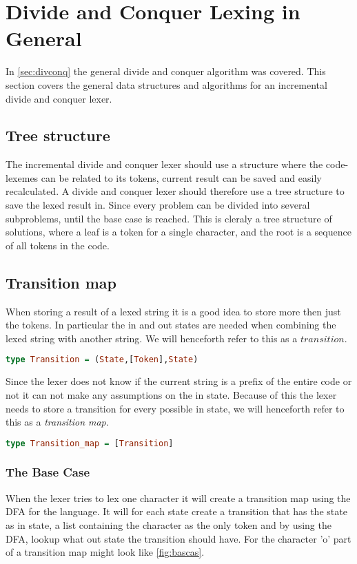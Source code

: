 \section{Divide and Conquer Lexing in General}
In \cref{sec:divconq} the general divide and conquer algorithm was covered. This
section covers the general data structures and algorithms for an incremental
divide and conquer lexer.

\subsection{Tree structure}
The incremental divide and conquer lexer should use a structure where the
code-lexemes can be related to its tokens, current result can be saved and
easily recalculated. A divide and conquer lexer should therefore use a tree
structure to save the lexed result in. Since every problem can be divided into
several subproblems, until the base case is reached. This is cleraly a tree
structure of solutions, where a leaf is a token for a single character, and the
root is a sequence of all tokens in the code.  

\subsection{Transition map}
When storing a result of a lexed string it is a good idea to store more then
just the tokens. In particular the in and out states are needed when combining
the lexed string with another string. We will henceforth refer to this as a
$transition$.
\begin{lstlisting}[language=Haskell]
type Transition = (State,[Token],State)
\end{lstlisting}
Since the lexer does not know if the current string is a prefix of the entire
code or not it can not make any assumptions on the in state. Because of this the
lexer needs to store a transition for every possible in state, we will henceforth
refer to this as a \emph{transition map}.
\begin{lstlisting}[language=Haskell]
type Transition_map = [Transition]
\end{lstlisting}
\subsubsection{The Base Case}
When the lexer tries to lex one character it will create a transition
map using the DFA for the language. It will for each state create a transition
that has the state as in state, a list containing the character as the only
token and by using the DFA, lookup what out state the transition should have.
For the character 'o' part of a transition map might look like \cref{fig:bascas}.

